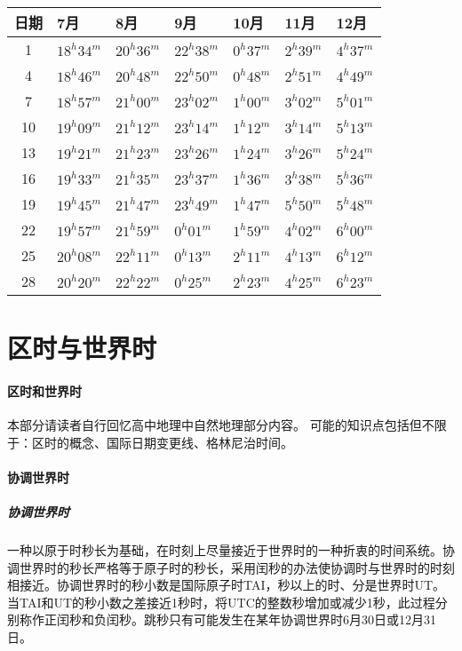 \begin{center}
\begin{tabularx}{\textwidth}{|c|X|X|X|X|X|X|}
	\hline
	日期&7月&8月&9月&10月&11月&12月\\
	\hline
	1&$18^h34^m$&$20^h36^m$&$22^h38^m$&$0^h37^m$&$2^h39^m$&$4^h37^m$\\
	\hline
	4&$18^h46^m$&$20^h48^m$&$22^h50^m$&$0^h48^m$&$2^h51^m$&$4^h49^m$\\
	\hline
	7&$18^h57^m$&$21^h00^m$&$23^h02^m$&$1^h00^m$&$3^h02^m$&$5^h01^m$\\
	\hline
	10&$19^h09^m$&$21^h12^m$&$23^h14^m$&$1^h12^m$&$3^h14^m$&$5^h13^m$\\
	\hline
	13&$19^h21^m$&$21^h23^m$&$23^h26^m$&$1^h24^m$&$3^h26^m$&$5^h24^m$\\
	\hline
	16&$19^h33^m$&$21^h35^m$&$23^h37^m$&$1^h36^m$&$3^h38^m$&$5^h36^m$\\
	\hline
	19&$19^h45^m$&$21^h47^m$&$23^h49^m$&$1^h47^m$&$5^h50^m$&$5^h48^m$\\
	\hline
	22&$19^h57^m$&$21^h59^m$&$0^h01^m$&$1^h59^m$&$4^h02^m$&$6^h00^m$\\
	\hline
	25&$20^h08^m$&$22^h11^m$&$0^h13^m$&$2^h11^m$&$4^h13^m$&$6^h12^m$\\
	\hline
	28&$20^h20^m$&$22^h22^m$&$0^h25^m$&$2^h23^m$&$4^h25^m$&$6^h23^m$\\
	\hline
\end{tabularx}
\end{center}
\section{区时与世界时}
\paragraph{区时和世界时}
本部分请读者自行回忆高中地理中自然地理部分内容。
可能的知识点包括但不限于：区时的概念、国际日期变更线、格林尼治时间。
\paragraph{协调世界时}
\subparagraph{协调世界时}一种以原于时秒长为基础，在时刻上尽量接近于世界时的一种折衷的时间系统。协调世界时的秒长严格等于原子时的秒长，采用闰秒的办法使协调时与世界时的时刻相接近。协调世界时的秒小数是国际原子时TAI，秒以上的时、分是世界时UT。当TAI和UT的秒小数之差接近1秒时，将UTC的整数秒增加或减少1秒，此过程分别称作正闰秒和负闰秒。跳秒只有可能发生在某年协调世界时6月30日或12月31日。


